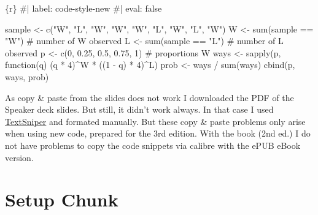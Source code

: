 \documentclass[
  letterpaper,
  DIV=11,
  numbers=noendperiod]{scrreprt}
\newenvironment{Shaded}{\begin{snugshade}}{\end{snugshade}}
\newcommand{\CommentTok}[1]{\textcolor[rgb]{0.37,0.37,0.37}{#1}}
\newcommand{\ControlFlowTok}[1]{\textcolor[rgb]{0.00,0.23,0.31}{#1}}
\newcommand{\DecValTok}[1]{\textcolor[rgb]{0.68,0.00,0.00}{#1}}
\newcommand{\FloatTok}[1]{\textcolor[rgb]{0.68,0.00,0.00}{#1}}
\newcommand{\FunctionTok}[1]{\textcolor[rgb]{0.28,0.35,0.67}{#1}}
\newcommand{\InformationTok}[1]{\textcolor[rgb]{0.37,0.37,0.37}{#1}}
\newcommand{\NormalTok}[1]{\textcolor[rgb]{0.00,0.23,0.31}{#1}}
\newcommand{\OtherTok}[1]{\textcolor[rgb]{0.00,0.23,0.31}{#1}}
\newcommand{\SpecialCharTok}[1]{\textcolor[rgb]{0.37,0.37,0.37}{#1}}
\newcommand{\StringTok}[1]{\textcolor[rgb]{0.13,0.47,0.30}{#1}}
\begin{document}
\begin{Shaded}
\begin{Highlighting}[]
\InformationTok{\textasciigrave{}\textasciigrave{}\textasciigrave{}\{r\}}
\CommentTok{\#| label: code{-}style{-}new}
\CommentTok{\#| eval: false}

\NormalTok{sample }\OtherTok{\textless{}{-}} \FunctionTok{c}\NormalTok{(}\StringTok{"W"}\NormalTok{, }\StringTok{"L"}\NormalTok{, }\StringTok{"W"}\NormalTok{, }\StringTok{"W"}\NormalTok{, }\StringTok{"W"}\NormalTok{, }\StringTok{"L"}\NormalTok{, }\StringTok{"W"}\NormalTok{, }\StringTok{"L"}\NormalTok{, }\StringTok{"W"}\NormalTok{)}
\NormalTok{W }\OtherTok{\textless{}{-}} \FunctionTok{sum}\NormalTok{(sample }\SpecialCharTok{==} \StringTok{"W"}\NormalTok{) }\CommentTok{\# number of W observed}
\NormalTok{L }\OtherTok{\textless{}{-}} \FunctionTok{sum}\NormalTok{(sample }\SpecialCharTok{==} \StringTok{"L"}\NormalTok{) }\CommentTok{\# number of L observed}
\NormalTok{p }\OtherTok{\textless{}{-}} \FunctionTok{c}\NormalTok{(}\DecValTok{0}\NormalTok{, }\FloatTok{0.25}\NormalTok{, }\FloatTok{0.5}\NormalTok{, }\FloatTok{0.75}\NormalTok{, }\DecValTok{1}\NormalTok{) }\CommentTok{\# proportions W}
\NormalTok{ways }\OtherTok{\textless{}{-}} \FunctionTok{sapply}\NormalTok{(p, }\ControlFlowTok{function}\NormalTok{(q) (q }\SpecialCharTok{*} \DecValTok{4}\NormalTok{)}\SpecialCharTok{\^{}}\NormalTok{W }\SpecialCharTok{*}\NormalTok{ ((}\DecValTok{1} \SpecialCharTok{{-}}\NormalTok{ q) }\SpecialCharTok{*} \DecValTok{4}\NormalTok{)}\SpecialCharTok{\^{}}\NormalTok{L)}
\NormalTok{prob }\OtherTok{\textless{}{-}}\NormalTok{ ways }\SpecialCharTok{/} \FunctionTok{sum}\NormalTok{(ways)}
\FunctionTok{cbind}\NormalTok{(p, ways, prob)}
\InformationTok{\textasciigrave{}\textasciigrave{}\textasciigrave{}}
\end{Highlighting}
\end{Shaded}

As copy \& paste from the slides does not work I downloaded the PDF of
the Speaker deck slides. But still, it didn't work always. In that case
I used \href{https://textsniper.app/}{TextSniper} and formated manually.
But these copy \& paste problems only arise when using new code,
prepared for the 3rd edition. With the book (2nd ed.) I do not have
problems to copy the code snippets via calibre with the ePUB eBook
version.

\hypertarget{setup-chunk}{%
\section*{Setup Chunk}\label{setup-chunk}}
\end{document}
